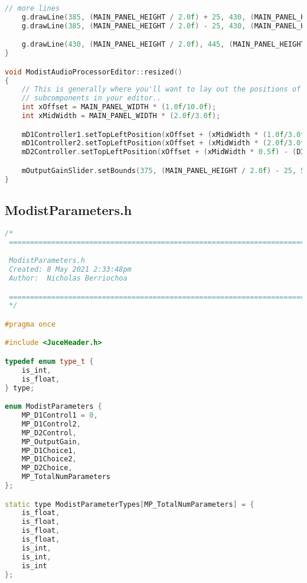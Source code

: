 \documentclass{article}
\begin{document}
\begin{appendix}
\begin{lstlisting}[language=C++]
    // more lines
    g.drawLine(385, (MAIN_PANEL_HEIGHT / 2.0f) + 25, 430, (MAIN_PANEL_HEIGHT / 2.0f));
    g.drawLine(385, (MAIN_PANEL_HEIGHT / 2.0f) - 25, 430, (MAIN_PANEL_HEIGHT / 2.0f));

    g.drawLine(430, (MAIN_PANEL_HEIGHT / 2.0f), 445, (MAIN_PANEL_HEIGHT / 2.0f));
}

void ModistAudioProcessorEditor::resized()
{
    // This is generally where you'll want to lay out the positions of any
    // subcomponents in your editor..
    int xOffset = MAIN_PANEL_WIDTH * (1.0f/10.0f);
    int xMidWidth = MAIN_PANEL_WIDTH * (2.0f/3.0f);

    mD1Controller1.setTopLeftPosition(xOffset + (xMidWidth * (1.0f/3.0f)) - (DIST_CONTROL_WIDTH / 2.0f), (MAIN_PANEL_HEIGHT * (1.0f/3.0f)) - (DIST_CONTROL_HEIGHT / 2.0f));
    mD1Controller2.setTopLeftPosition(xOffset + (xMidWidth * (2.0f/3.0f)) - (DIST_CONTROL_WIDTH / 2.0f), (MAIN_PANEL_HEIGHT * (1.0f/3.0f)) - (DIST_CONTROL_HEIGHT / 2.0f));
    mD2Controller.setTopLeftPosition(xOffset + (xMidWidth * 0.5f) - (DIST_CONTROL_WIDTH / 2.0f), (MAIN_PANEL_HEIGHT * (2.0f/3.0f)) - (DIST_CONTROL_HEIGHT / 2.0f));

    mOutputGainSlider.setBounds(375, (MAIN_PANEL_HEIGHT / 2.0f) - 25, 50, 50);
}
\end{lstlisting}

\pagebreak
\subsection{ModistParameters.h}
\begin{lstlisting}[language=C++]
/*
 ==============================================================================

 ModistParameters.h
 Created: 8 May 2021 2:33:48pm
 Author:  Nicholas Berriochoa

 ==============================================================================
 */

#pragma once

#include <JuceHeader.h>

typedef enum type_t {
    is_int,
    is_float,
} type;

enum ModistParameters {
    MP_D1Control1 = 0,
    MP_D1Control2,
    MP_D2Control,
    MP_OutputGain,
    MP_D1Choice1,
    MP_D1Choice2,
    MP_D2Choice,
    MP_TotalNumParameters
};

static type ModistParameterTypes[MP_TotalNumParameters] = {
    is_float,
    is_float,
    is_float,
    is_float,
    is_int,
    is_int,
    is_int
};


\end{lstlisting}
\end{appendix}
\end{document}
